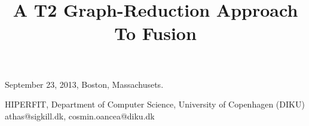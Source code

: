 \documentclass{sigplanconf}  %
\newcommand{\LO}{$\mathcal{L}_0$}
\newcommand{\comment}[2]{\textcolor{red}{\scriptsize \textsf \textbf{#1:}{#2}}}
\begin{document}

 {September 23, 2013, Boston, Massachusets.}
\exclusivelicense

\title{A T2 Graph-Reduction Approach To Fusion}


           {HIPERFIT, Department of Computer Science, University of Copenhagen (DIKU)}
           {athas@sigkill.dk, cosmin.oancea@diku.dk}



\maketitle
\end{document}
